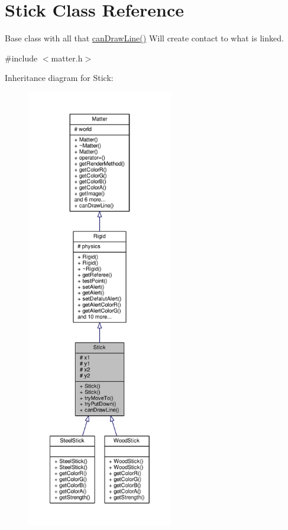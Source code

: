 \hypertarget{classStick}{}\section{Stick Class Reference}
\label{classStick}


Base class with all that \hyperlink{classStick_ad2b8a92274aed6d25d79c8b4033b2bfb}{can\+Draw\+Line()} Will create contact to what is linked.  




{\ttfamily \#include $<$matter.\+h$>$}



Inheritance diagram for Stick\+:\nopagebreak
\begin{figure}[H]
\begin{center}
\leavevmode
\includegraphics[height=550pt]{classStick__inherit__graph}
\end{center}
\end{figure}


